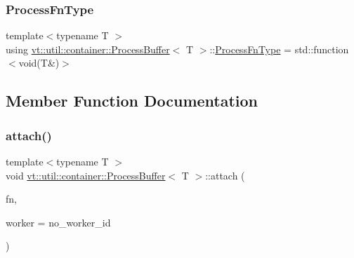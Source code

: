 \subsubsection{\texorpdfstring{Process\+Fn\+Type}{ProcessFnType}}
{\footnotesize\ttfamily template$<$typename T $>$ \\
using \hyperlink{structvt_1_1util_1_1container_1_1_process_buffer}{vt\+::util\+::container\+::\+Process\+Buffer}$<$ T $>$\+::\hyperlink{structvt_1_1util_1_1container_1_1_process_buffer_a20be3480fb453096015a6fe5ca370816}{Process\+Fn\+Type} =  std\+::function$<$void(T\&)$>$}



\subsection{Member Function Documentation}
\mbox{\label{structvt_1_1util_1_1container_1_1_process_buffer_ab8b25ce1820da72a1770778252dabfea}} 
\subsubsection{\texorpdfstring{attach()}{attach()}}
{\footnotesize\ttfamily template$<$typename T $>$ \\
void \hyperlink{structvt_1_1util_1_1container_1_1_process_buffer}{vt\+::util\+::container\+::\+Process\+Buffer}$<$ T $>$\+::attach (\begin{DoxyParamCaption}\item[{\hyperlink{structvt_1_1util_1_1container_1_1_process_buffer_a20be3480fb453096015a6fe5ca370816}{Process\+Fn\+Type}}]{fn,  }\item[{\hyperlink{namespacevt_a656e362091da17b9b93d0655b36e3392}{Worker\+I\+D\+Type}}]{worker = {\ttfamily no\+\_\+worker\+\_\+id} }\end{DoxyParamCaption})\hspace{0.3cm}{\ttfamily [inline]}}

\mbox{\label{structvt_1_1util_1_1container_1_1_process_buffer_ae1bff94f45b85fa126a63b98c6c2e869}} 
